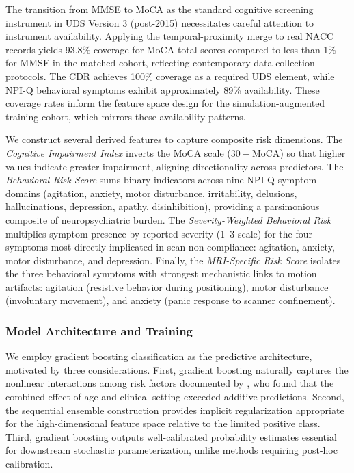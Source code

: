 \documentclass[11pt,a4paper]{article}
\begin{document}
The transition from MMSE to MoCA as the standard cognitive screening instrument in UDS Version 3 (post-2015) necessitates careful attention to instrument availability. Applying the temporal-proximity merge to real NACC records yields 93.8\% coverage for MoCA total scores compared to less than 1\% for MMSE in the matched cohort, reflecting contemporary data collection protocols. The CDR achieves 100\% coverage as a required UDS element, while NPI-Q behavioral symptoms exhibit approximately 89\% availability. These coverage rates inform the feature space design for the simulation-augmented training cohort, which mirrors these availability patterns.

We construct several derived features to capture composite risk dimensions. The \textit{Cognitive Impairment Index} inverts the MoCA scale ($30 - \text{MoCA}$) so that higher values indicate greater impairment, aligning directionality across predictors. The \textit{Behavioral Risk Score} sums binary indicators across nine NPI-Q symptom domains (agitation, anxiety, motor disturbance, irritability, delusions, hallucinations, depression, apathy, disinhibition), providing a parsimonious composite of neuropsychiatric burden. The \textit{Severity-Weighted Behavioral Risk} multiplies symptom presence by reported severity (1--3 scale) for the four symptoms most directly implicated in scan non-compliance: agitation, anxiety, motor disturbance, and depression. Finally, the \textit{MRI-Specific Risk Score} isolates the three behavioral symptoms with strongest mechanistic links to motion artifacts: agitation (resistive behavior during positioning), motor disturbance (involuntary movement), and anxiety (panic response to scanner confinement).

\subsubsection{Model Architecture and Training}

We employ gradient boosting classification \citep{friedman2001greedy} as the predictive architecture, motivated by three considerations. First, gradient boosting naturally captures the nonlinear interactions among risk factors documented by \citet{porembka2025disparities}, who found that the combined effect of age and clinical setting exceeded additive predictions. Second, the sequential ensemble construction provides implicit regularization appropriate for the high-dimensional feature space relative to the limited positive class. Third, gradient boosting outputs well-calibrated probability estimates essential for downstream stochastic parameterization, unlike methods requiring post-hoc calibration.
\end{document}
